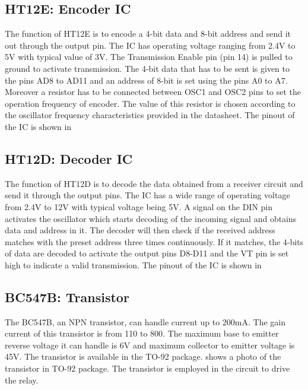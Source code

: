\subsection{HT12E: Encoder IC}

The function of HT12E is to encode a 4-bit data and 8-bit address and send it out through the output pin. The IC has operating voltage ranging from 2.4V to 5V with typical value of 3V. The Transmission Enable pin (pin 14) is pulled to ground to activate transmission. The 4-bit data that has to be sent is given to the pins AD8 to AD11 and an address of 8-bit is set using the pins A0 to A7.  Moreover a resistor has to be connected between OSC1 and OSC2 pins to set the operation frequency of encoder. The value of this resistor is chosen according to the oscillator frequency characteristics provided in the datasheet\cite{ht12e}. The pinout of the IC is shown in 

\vspace{10pt}


\subsection{HT12D: Decoder IC}

The function of HT12D is to decode the data obtained from a receiver circuit and send it through the output pins. The IC has a wide range of operating voltage from 2.4V to 12V with typical voltage being 5V. A signal on the DIN pin activates the oscillator which starts decoding of the incoming signal and obtains data and address in it. The decoder will then check if the received address matches with the preset address three times continuously. If it matches, the 4-bits of data are decoded to activate the output pins D8-D11 and the VT pin is set high to indicate a valid transmission\cite{ht12d}. The pinout of the IC is shown in 

\vspace{10pt}

\subsection{BC547B: Transistor}

The BC547B, an NPN transistor, can handle current up to 200mA. The gain current of this transistor is from 110 to 800. The maximum base to emitter reverse voltage it can handle is 6V and maximum collector to emitter voltage is 45V. The transistor is available in the TO-92 package\cite{bc547}.  shows a photo of the transistor in TO-92 package. The transistor is employed in the circuit to drive the relay. \\

